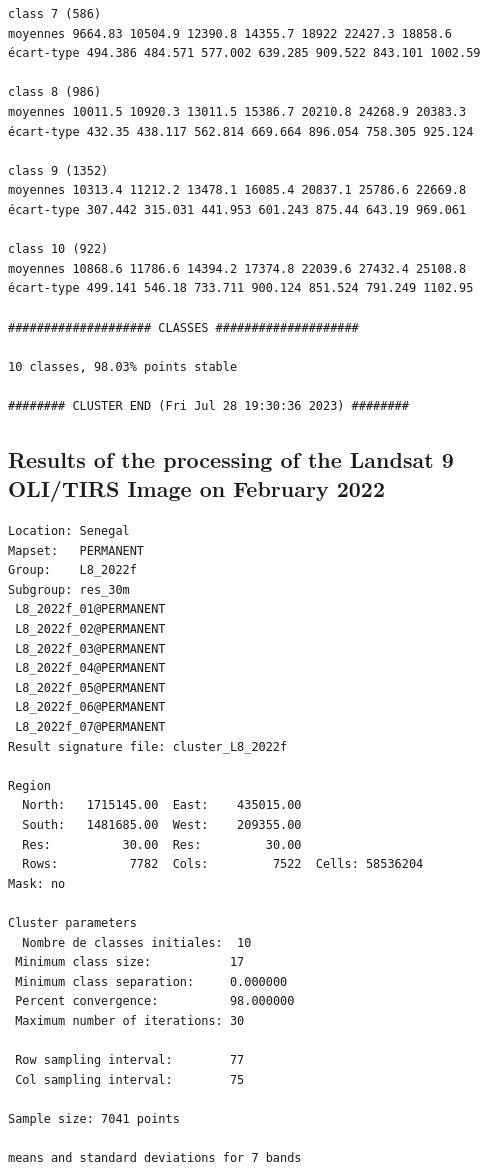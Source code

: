 \documentclass[earth,article,accept,pdftex,moreauthors]{Definitions/mdpi}
\begin{document}
{\begin{scriptsize}
\begin{verbatim}
class 7 (586)
moyennes 9664.83 10504.9 12390.8 14355.7 18922 22427.3 18858.6
écart-type 494.386 484.571 577.002 639.285 909.522 843.101 1002.59

class 8 (986)
moyennes 10011.5 10920.3 13011.5 15386.7 20210.8 24268.9 20383.3
écart-type 432.35 438.117 562.814 669.664 896.054 758.305 925.124

class 9 (1352)
moyennes 10313.4 11212.2 13478.1 16085.4 20837.1 25786.6 22669.8
écart-type 307.442 315.031 441.953 601.243 875.44 643.19 969.061

class 10 (922)
moyennes 10868.6 11786.6 14394.2 17374.8 22039.6 27432.4 25108.8
écart-type 499.141 546.18 733.711 900.124 851.524 791.249 1102.95

#################### CLASSES ####################

10 classes, 98.03% points stable

######## CLUSTER END (Fri Jul 28 19:30:36 2023) ########

\end{verbatim}
\end{scriptsize}

\subsection[\appendixname~\thesubsection]{Results of the processing of the Landsat 9 OLI/TIRS Image on February 2022}
\begin{scriptsize}
\begin{verbatim}
Location: Senegal
Mapset:   PERMANENT
Group:    L8_2022f
Subgroup: res_30m
 L8_2022f_01@PERMANENT
 L8_2022f_02@PERMANENT
 L8_2022f_03@PERMANENT
 L8_2022f_04@PERMANENT
 L8_2022f_05@PERMANENT
 L8_2022f_06@PERMANENT
 L8_2022f_07@PERMANENT
Result signature file: cluster_L8_2022f

Region
  North:   1715145.00  East:    435015.00
  South:   1481685.00  West:    209355.00
  Res:          30.00  Res:         30.00
  Rows:          7782  Cols:         7522  Cells: 58536204
Mask: no

Cluster parameters
  Nombre de classes initiales: 	10
 Minimum class size:           17
 Minimum class separation:     0.000000
 Percent convergence:          98.000000
 Maximum number of iterations: 30

 Row sampling interval:        77
 Col sampling interval:        75

Sample size: 7041 points

means and standard deviations for 7 bands


\end{verbatim}
\end{scriptsize}}
\end{document}
